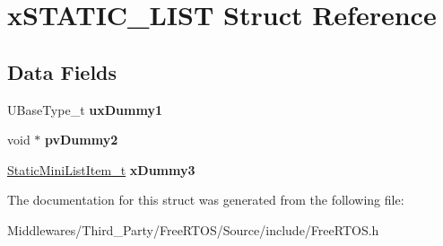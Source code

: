 \hypertarget{structx_s_t_a_t_i_c___l_i_s_t}{}\section{x\+S\+T\+A\+T\+I\+C\+\_\+\+L\+I\+ST Struct Reference}
\label{structx_s_t_a_t_i_c___l_i_s_t}
\subsection*{Data Fields}
\begin{DoxyCompactItemize}
\item 
\mbox{\label{structx_s_t_a_t_i_c___l_i_s_t_a721a2d25ba03ddd0abfcf3d9336e8f12}} 
U\+Base\+Type\+\_\+t {\bfseries ux\+Dummy1}
\item 
\mbox{\label{structx_s_t_a_t_i_c___l_i_s_t_a44b3b17a1410a0bcec9b416f2bc89a96}} 
void $\ast$ {\bfseries pv\+Dummy2}
\item 
\mbox{\label{structx_s_t_a_t_i_c___l_i_s_t_a22f81ad5d2e6efe9c850330af339ac02}} 
\mbox{\hyperlink{structx_s_t_a_t_i_c___m_i_n_i___l_i_s_t___i_t_e_m}{Static\+Mini\+List\+Item\+\_\+t}} {\bfseries x\+Dummy3}
\end{DoxyCompactItemize}


The documentation for this struct was generated from the following file\+:\begin{DoxyCompactItemize}
\item 
Middlewares/\+Third\+\_\+\+Party/\+Free\+R\+T\+O\+S/\+Source/include/Free\+R\+T\+O\+S.\+h\end{DoxyCompactItemize}
